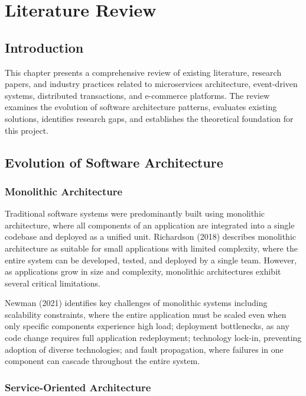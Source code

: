 \chapter{Literature Review}

\section{Introduction}

This chapter presents a comprehensive review of existing literature, research papers, and industry practices related to microservices architecture, event-driven systems, distributed transactions, and e-commerce platforms. The review examines the evolution of software architecture patterns, evaluates existing solutions, identifies research gaps, and establishes the theoretical foundation for this project.

\section{Evolution of Software Architecture}

\subsection{Monolithic Architecture}

Traditional software systems were predominantly built using monolithic architecture, where all components of an application are integrated into a single codebase and deployed as a unified unit. Richardson (2018) describes monolithic architecture as suitable for small applications with limited complexity, where the entire system can be developed, tested, and deployed by a single team. However, as applications grow in size and complexity, monolithic architectures exhibit several critical limitations.

Newman (2021) identifies key challenges of monolithic systems including scalability constraints, where the entire application must be scaled even when only specific components experience high load; deployment bottlenecks, as any code change requires full application redeployment; technology lock-in, preventing adoption of diverse technologies; and fault propagation, where failures in one component can cascade throughout the entire system.

\subsection{Service-Oriented Architecture}

